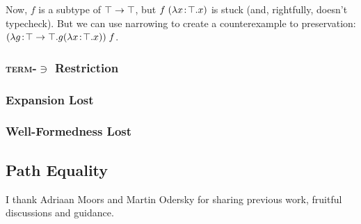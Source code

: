\documentclass[preprint,9pt]{sigplanconf}
\begin{document}
Now, $f$ is a subtype of $\top \rightarrow \top$, but $f\;(\lambda x\!:\!\top.x)$ is stuck (and, rightfully, doesn't typecheck). But we can use
narrowing to create a counterexample to preservation: $(\lambda g\!:\!\top \rightarrow \top.g (\lambda x\!:\!\top.x))\;f$.

\subsubsection{\texorpdfstring{\textsc{term-$\ni$}}{Term-Mem} Restriction}\label{term_mem}

\subsubsection{Expansion Lost}\label{narrowing_exp}

\subsubsection{Well-Formedness Lost}\label{narrowing_wf}

\subsection{Path Equality}\label{patheq}

\acks

I thank Adriaan Moors and Martin Odersky for sharing previous work,
fruitful discussions and guidance.

%
%
\end{document}
